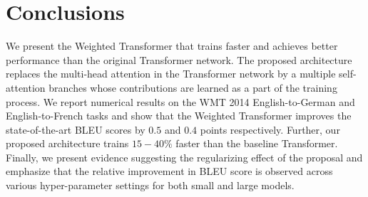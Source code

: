 \documentclass{article} %
\newcommand{\name}{Weighted Transformer\xspace}
\begin{document}
\section{Conclusions}
We present the \name that trains faster and achieves better performance than the original Transformer network. The proposed architecture replaces the multi-head attention in the Transformer network by a multiple self-attention branches whose contributions are learned as a part of the training process. We report numerical results on the WMT 2014 English-to-German and English-to-French tasks and show that the \name improves the state-of-the-art BLEU scores by $0.5$ and $0.4$ points respectively. Further, our proposed architecture trains $15-40\%$ faster than the baseline Transformer. Finally, we present evidence suggesting the regularizing effect of the proposal and emphasize that the relative improvement in BLEU score is observed across various hyper-parameter settings for both small and large models.



\end{document}
